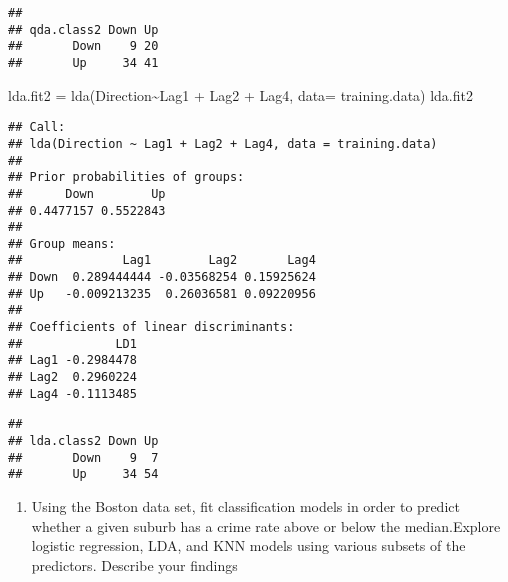 \documentclass[
]{article}
\newenvironment{Shaded}{\begin{snugshade}}{\end{snugshade}}
\newcommand{\AttributeTok}[1]{\textcolor[rgb]{0.77,0.63,0.00}{#1}}
\newcommand{\FunctionTok}[1]{\textcolor[rgb]{0.00,0.00,0.00}{#1}}
\newcommand{\NormalTok}[1]{#1}
\newcommand{\OtherTok}[1]{\textcolor[rgb]{0.56,0.35,0.01}{#1}}
\newcommand{\SpecialCharTok}[1]{\textcolor[rgb]{0.00,0.00,0.00}{#1}}
\newcommand{\StringTok}[1]{\textcolor[rgb]{0.31,0.60,0.02}{#1}}
\providecommand{\tightlist}{%
  \setlength{\itemsep}{0pt}\setlength{\parskip}{0pt}}
\begin{document}
\begin{verbatim}
##           
## qda.class2 Down Up
##       Down    9 20
##       Up     34 41
\end{verbatim}

\begin{Shaded}
\begin{Highlighting}[]
\NormalTok{lda.fit2 }\OtherTok{=} \FunctionTok{lda}\NormalTok{(Direction}\SpecialCharTok{\textasciitilde{}}\NormalTok{Lag1 }\SpecialCharTok{+}\NormalTok{ Lag2 }\SpecialCharTok{+}\NormalTok{ Lag4, }\AttributeTok{data=}\NormalTok{ training.data)}
\NormalTok{lda.fit2}
\end{Highlighting}
\end{Shaded}

\begin{verbatim}
## Call:
## lda(Direction ~ Lag1 + Lag2 + Lag4, data = training.data)
## 
## Prior probabilities of groups:
##      Down        Up 
## 0.4477157 0.5522843 
## 
## Group means:
##              Lag1        Lag2       Lag4
## Down  0.289444444 -0.03568254 0.15925624
## Up   -0.009213235  0.26036581 0.09220956
## 
## Coefficients of linear discriminants:
##             LD1
## Lag1 -0.2984478
## Lag2  0.2960224
## Lag4 -0.1113485
\end{verbatim}

\begin{Shaded}
\end{Shaded}

\begin{verbatim}
##           
## lda.class2 Down Up
##       Down    9  7
##       Up     34 54
\end{verbatim}

\begin{enumerate}
\def\labelenumi{\arabic{enumi}.}
\setcounter{enumi}{12}
\tightlist
\item
  Using the Boston data set, fit classification models in order to
  predict whether a given suburb has a crime rate above or below the
  median.Explore logistic regression, LDA, and KNN models using various
  subsets of the predictors. Describe your findings
\end{enumerate}
\end{document}
